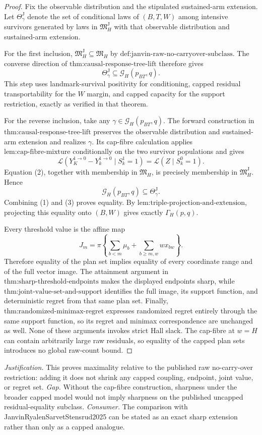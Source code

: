 \documentclass{article}
\begin{document}
\begin{proof}
Fix the observable distribution and the stipulated sustained-arm extension. Let \(\Theta_{\gamma}^{\mathrm J}\) denote the set of conditional laws of \((B,T,W)\) among intensive survivors generated by laws in \(\mathfrak M_H^{\mathrm J}\) with that observable distribution and sustained-arm extension.

For the first inclusion, \(\mathfrak M_H^{\mathrm J}\subseteq\mathfrak M_H\) by \(\text{def:janvin-raw-no-carryover-subclass}\). The converse direction of \(\text{thm:causal-response-tree-lift}\) therefore gives
\[
 \Theta_{\gamma}^{\mathrm J}\subseteq\mathcal G_H(p_{BT},q). \tag{1}
\]
This step uses landmark-survival positivity for conditioning, capped residual transportability for the \(W\) margin, and capped capacity for the support restriction, exactly as verified in that theorem.

For the reverse inclusion, take any \(\gamma\in\mathcal G_H(p_{BT},q)\). The forward construction in \(\text{thm:causal-response-tree-lift}\) preserves the observable distribution and sustained-arm extension and realizes \(\gamma\). Its cap-fibre calculation applies \(\text{lem:cap-fibre-mixture}\) conditionally on the two survivor populations and gives
\[
 \mathcal L(Y_K^{1\to0}-Y_k^{1\to0}\mid S_k^1=1)
 =\mathcal L(Z\mid S_k^0=1).                              \tag{2}
\]
Equation (2), together with membership in \(\mathfrak M_H\), is precisely membership in \(\mathfrak M_H^{\mathrm J}\). Hence
\[
 \mathcal G_H(p_{BT},q)\subseteq\Theta_{\gamma}^{\mathrm J}. \tag{3}
\]
Combining (1) and (3) proves equality. By \(\text{lem:triple-projection-and-extension}\), projecting this equality onto \((B,W)\) gives exactly \(\Gamma_H(p,q)\).

Every threshold value is the affine map
\[
 J_m=\pi\left\{\sum_{b<m}\mu_b+
                  \sum_{b\ge m,w}wx_{bw}\right\}.       \tag{4}
\]
Therefore equality of the plan set implies equality of every coordinate range and of the full vector image. The attainment argument in \(\text{thm:sharp-threshold-endpoints}\) makes the displayed endpoints sharp, while \(\text{thm:joint-value-set-and-support}\) identifies the full image, its support function, and deterministic regret from that same plan set. Finally, \(\text{thm:randomized-minimax-regret}\) expresses randomized regret entirely through the same support function, so its regret and minimax correspondence are unchanged as well. None of these arguments invokes strict Hall slack. The cap-fibre at \(w=H\) can contain arbitrarily large raw residuals, so equality of the capped plan sets introduces no global raw-count bound.
\end{proof}
\par\smallskip\noindent \textit{Justification.} This proves maximality relative to the published raw no-carry-over restriction: adding it does not shrink any capped coupling, endpoint, joint value, or regret set. \textit{Gap.} Without the cap-fibre construction, sharpness under the broader capped model would not imply sharpness on the published uncapped residual-equality subclass. \textit{Consumer.} The comparison with JanvinRyalenSarvetStensrud2025 can be stated as an exact sharp extension rather than only as a capped analogue.
\end{document}
